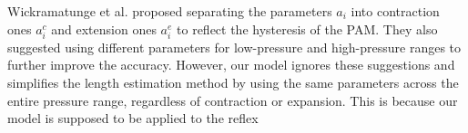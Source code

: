 Wickramatunge et al. proposed separating the parameters $a_i$ into contraction ones $a^c_i$ and extension ones $a^e_i$ to reflect the hysteresis of the PAM\cite{spring}. They also suggested using different parameters for low-pressure and high-pressure ranges to further improve the accuracy. However, our model ignores these suggestions and simplifies the length estimation method by using the same parameters across the entire pressure range, regardless of contraction or expansion. This is because our model is supposed to be applied to the reflex 


